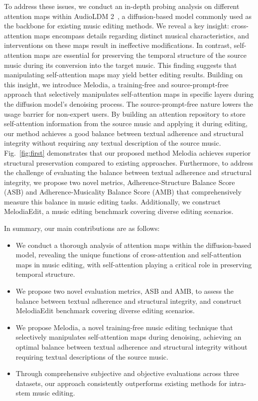 To address these issues, we conduct an in-depth probing analysis on different attention maps within AudioLDM 2~\cite{audioldm2}, a diffusion-based model commonly used as the backbone for existing music editing methods. We reveal a key insight: cross-attention maps encompass details regarding distinct musical characteristics, and interventions on these maps result in ineffective modifications. In contrast, self-attention maps are essential for preserving the temporal structure of the source music during its conversion into the target music. This finding suggests that manipulating self-attention maps may yield better editing results. Building on this insight, we introduce Melodia, a training-free and source-prompt-free approach that selectively manipulates self-attention maps in specific layers during the diffusion model's denoising process. The source-prompt-free nature lowers the usage barrier for non-expert users. By building an attention repository to store self-attention information from the source music and applying it during editing, our method achieves a good balance between textual adherence and structural integrity without requiring any textual description of the source music. Fig.~\ref{fig:first} demonstrates that our proposed method Melodia achieves superior structural preservation compared to existing approaches. Furthermore, to address the challenge of evaluating the balance between textual adherence and structural integrity, we propose two novel metrics, Adherence-Structure Balance Score (ASB) and Adherence-Musicality Balance Score (AMB) that comprehensively measure this balance in music editing tasks.
Additionally, we construct MelodiaEdit, a music editing benchmark covering diverse editing scenarios.

In summary, our main contributions are as follows:
\begin{itemize}
\item We conduct a thorough analysis of attention maps within the diffusion-based model, revealing the unique functions of cross-attention and self-attention maps in music editing, with self-attention playing a critical role in preserving temporal structure.

\item We propose two novel evaluation metrics, ASB and AMB, to assess the balance between textual adherence and structural integrity, and construct MelodiaEdit benchmark covering diverse editing scenarios.

\item We propose Melodia, a novel training-free music editing technique that selectively manipulates self-attention maps during denoising, achieving an optimal balance between textual adherence and structural integrity without requiring textual descriptions of the source music.

\item Through comprehensive subjective and objective evaluations across three datasets, our approach consistently outperforms existing methods for intra-stem music editing.
\end{itemize}

